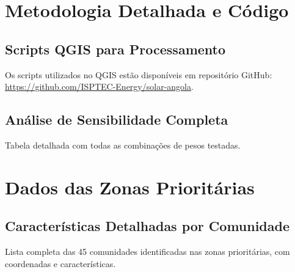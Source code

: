 \documentclass[12pt, a4paper]{article}
\begin{document}
\appendix
\section{Metodologia Detalhada e Código}
\subsection{Scripts QGIS para Processamento}
Os scripts utilizados no QGIS estão disponíveis em repositório GitHub: \url{https://github.com/ISPTEC-Energy/solar-angola}.

\subsection{Análise de Sensibilidade Completa}
Tabela detalhada com todas as combinações de pesos testadas.

\section{Dados das Zonas Prioritárias}
\subsection{Características Detalhadas por Comunidade}
Lista completa das 45 comunidades identificadas nas zonas prioritárias, com coordenadas e características.
\end{document}
